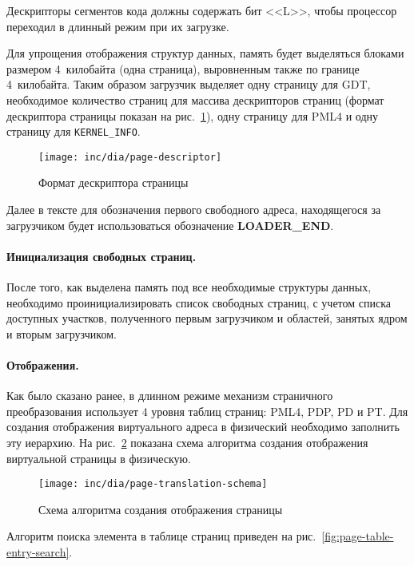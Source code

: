 Дескрипторы сегментов кода должны содержать бит <<L>>, чтобы процессор переходил в длинный
режим при их загрузке.

Для упрощения отображения структур данных, память будет выделяться блоками размером 4~килобайта (одна страница),
выровненным также по границе 4~килобайта. Таким образом загрузчик выделяет одну страницу для GDT, необходимое
количество страниц для массива дескрипторов страниц (формат дескриптора страницы показан на рис.~\ref{fig:page-descriptor}),
одну страницу для PML4 и одну страницу для \texttt{KERNEL\_INFO}.

\begin{figure}[ht!]
  \centering
  \texttt{[image: inc/dia/page-descriptor]}
  \caption{Формат дескриптора страницы}
  \label{fig:page-descriptor}
\end{figure}

Далее в тексте для обозначения первого свободного адреса, находящегося за загрузчиком будет использоваться
обозначение \textbf{LOADER\_END}.


\paragraph{Инициализация свободных страниц.} После того, как выделена память под все
необходимые структуры данных, необходимо проинициализировать список свободных страниц,
с учетом списка доступных участков, полученного первым загрузчиком и областей,
занятых ядром и вторым загрузчиком.

\paragraph{Отображения.} Как было сказано ранее, в длинном режиме механизм страничного преобразования
использует 4 уровня таблиц страниц: PML4, PDP, PD и PT. Для создания отображения виртуального адреса
в физический необходимо заполнить эту иерархию. На рис.~\ref{fig:page-translation-schema} показана схема
алгоритма создания отображения виртуальной страницы в физическую.

\begin{figure}[ht!]
  \centering
  \texttt{[image: inc/dia/page-translation-schema]}
  \caption{Схема алгоритма создания отображения страницы}
  \label{fig:page-translation-schema}
\end{figure}

Алгоритм поиска элемента в таблице страниц приведен на рис.~\ref{fig:page-table-entry-search}.

